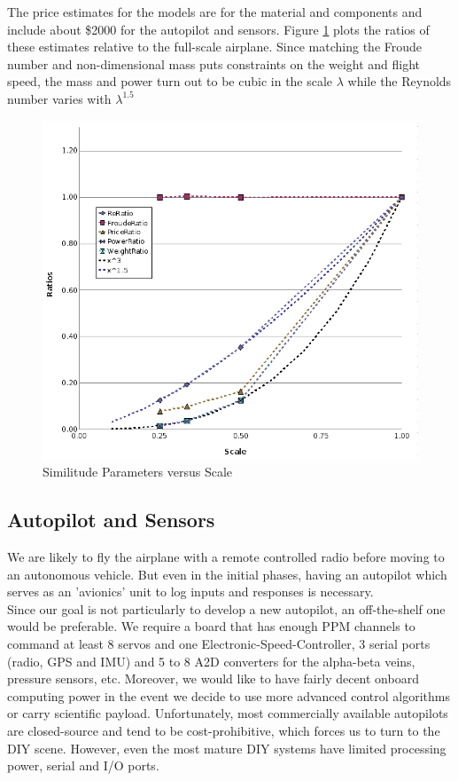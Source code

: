 \documentclass[titlepage,10pt]{article}
\begin{document}
The price estimates for the models are for the material and components and include about \$2000 for the autopilot and sensors. Figure \ref{fig:scales} plots the ratios of these estimates relative to the full-scale airplane. Since matching the Froude number and non-dimensional mass puts constraints on the weight and flight speed, the mass and power turn out to be cubic in the scale $\lambda$ while the Reynolds number varies with $\lambda^{1.5}$

\begin{figure}[h]
\begin{center}
\includegraphics[width=140mm]{scale-graph.png}
\end{center}
\caption{Similitude Parameters versus Scale}
\label{fig:scales}
\end{figure}

\clearpage


\subsection{Autopilot and Sensors}
We are likely to fly the airplane with a remote controlled radio before moving to an autonomous vehicle. But even in the initial phases, having an autopilot which serves as an 'avionics' unit to log inputs and responses is necessary.\\

Since our goal is not particularly to develop a new autopilot, an off-the-shelf one would be preferable. We require a board that has enough PPM channels to command at least 8 servos and one Electronic-Speed-Controller, 3 serial ports (radio, GPS and IMU) and 5 to 8 A2D converters for the alpha-beta veins, pressure sensors, etc. Moreover, we would like to have fairly decent onboard computing power in the event we decide to use more advanced control algorithms or carry scientific payload. Unfortunately, most commercially available autopilots are closed-source and tend to be cost-prohibitive, which forces us to turn to the DIY scene. However, even the most mature DIY systems have limited processing power, serial and I/O ports.\\
\end{document}
